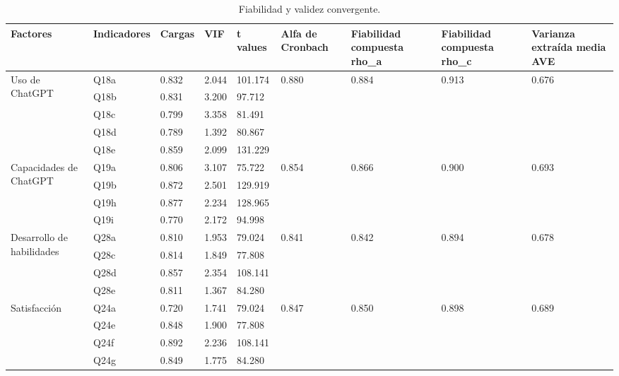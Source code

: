 \documentclass[spanish]{textolivre}
\begin{document}
\begin{table}[h!]
\centering
\small
\begin{threeparttable}
\caption{Fiabilidad y validez convergente.}\label{tab-3}
\begin{tabular}{
p{1.5cm} 
p{1.3cm} 
p{1cm} 
p{1cm} 
p{1.1cm} 
p{1.2cm} 
p{1.3cm} 
p{1.3cm} 
p{1.2cm}}
\toprule
Factores & Indicadores & Cargas & VIF & t values & Alfa de \newline Cronbach & Fiabilidad \newline compuesta \newline rho\_a & Fiabilidad \newline compuesta \newline rho\_c & Varianza extraída media AVE \\
\midrule

\multirow{5}{=}{Uso de ChatGPT}
& Q18a & 0.832 & 2.044 & 101.174 & \multirow{5}{*}{0.880} & \multirow{5}{*}{0.884} & \multirow{5}{*}{0.913} & \multirow{5}{*}{0.676} \\
& Q18b & 0.831 & 3.200 & 97.712 \\
& Q18c & 0.799 & 3.358 & 81.491 \\
& Q18d & 0.789 & 1.392 & 80.867 \\
& Q18e & 0.859 & 2.099 & 131.229 \\

\midrule

\multirow{4}{=}{Capacidades de ChatGPT}
& Q19a & 0.806 & 3.107 & 75.722 & \multirow{4}{*}{0.854} & \multirow{4}{*}{0.866} & \multirow{4}{*}{0.900} & \multirow{4}{*}{0.693} \\
& Q19b & 0.872 & 2.501 & 129.919 \\
& Q19h & 0.877 & 2.234 & 128.965 \\
& Q19i & 0.770 & 2.172 & 94.998 \\

\midrule

\multirow{4}{=}{Desarrollo de habilidades}
& Q28a & 0.810 & 1.953 & 79.024 & \multirow{4}{*}{0.841} & \multirow{4}{*}{0.842} & \multirow{4}{*}{0.894} & \multirow{4}{*}{0.678} \\
& Q28c & 0.814 & 1.849 & 77.808 \\
& Q28d & 0.857 & 2.354 & 108.141 \\
& Q28e & 0.811 & 1.367 & 84.280 \\

\midrule

\multirow{4}{=}{Satisfacción}
& Q24a & 0.720 & 1.741 & 79.024 & \multirow{4}{*}{0.847} & \multirow{4}{*}{0.850} & \multirow{4}{*}{0.898} & \multirow{4}{*}{0.689} \\
& Q24e & 0.848 & 1.900 & 77.808 \\
& Q24f & 0.892 & 2.236 & 108.141 \\
& Q24g & 0.849 & 1.775 & 84.280 \\

\bottomrule
\end{tabular}
\end{threeparttable}
\end{table}
\end{document}
